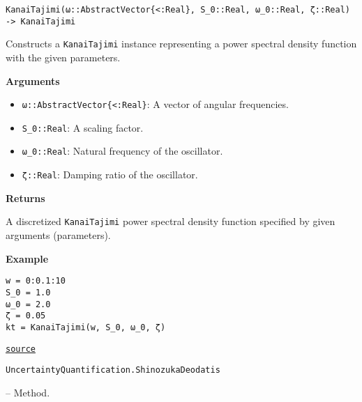 \begin{adjustwidth}{2em}{0pt}


\begin{verbatim}
KanaiTajimi(ω::AbstractVector{<:Real}, S_0::Real, ω_0::Real, ζ::Real) -> KanaiTajimi
\end{verbatim}

Constructs a \texttt{KanaiTajimi} instance representing a power spectral density function with the given parameters.

\textbf{Arguments}

\begin{itemize}
\item \texttt{ω::AbstractVector\{<:Real\}}: A vector of angular frequencies.


\item \texttt{S\_0::Real}: A scaling factor.


\item \texttt{ω\_0::Real}: Natural frequency of the oscillator.


\item \texttt{ζ::Real}: Damping ratio of the oscillator.

\end{itemize}
\textbf{Returns}

A discretized \texttt{KanaiTajimi} power spectral density function specified by given arguments (parameters).

\textbf{Example}


\begin{verbatim}
w = 0:0.1:10
S_0 = 1.0
ω_0 = 2.0
ζ = 0.05
kt = KanaiTajimi(w, S_0, ω_0, ζ)
\end{verbatim}



\href{https://github.com/friesischscott/UncertaintyQuantification.jl/blob/f5ee6cce729f0d6a57979257379c942cdf42f86f/src/dynamics/psd.jl#L60-L82}{\texttt{source}}


\end{adjustwidth}
\hypertarget{698434710585563404}{\texttt{UncertaintyQuantification.ShinozukaDeodatis}}  -- {Method.}

